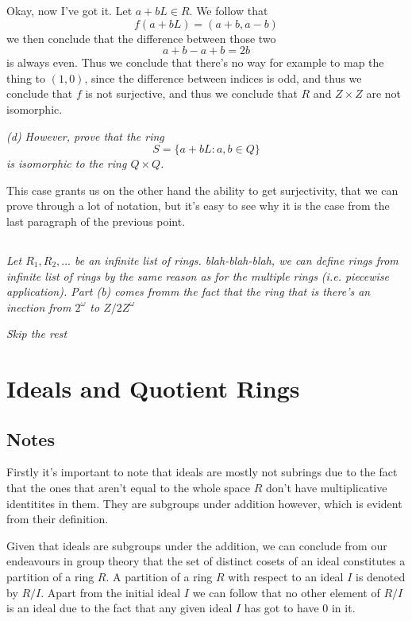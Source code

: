 \documentclass[11pt,oneside,titlepage]{book}
\newcommand{\set}[1]{\{ #1 \}}
\begin{document}
Okay, now I've got it. Let $a + bL \in R$. We follow that
$$f(a + bL) = (a + b, a - b)$$
we then conclude that the difference between those two
$$a + b - a + b = 2b$$
is always even. Thus we conclude that there's no way for example to
map the thing to $(1, 0)$, since the difference between indices is odd,
and thus we conclude that $f$ is not surjective, and thus we conclude that
$R$ and $Z \times Z$ are not isomorphic. 

\textit{(d) However, prove that the ring
  $$S = \set{a + bL: a, b \in Q}$$
  is isomorphic to the ring $Q \times Q$.
}

This case grants us on the other hand the ability to get surjectivity,
that we can prove through a lot of notation, but it's easy to see why
it is the case from the last paragraph of the previous point.

\subsection{}

\textit{Let $R_1, R_2, ...$ be an infinite list of
rings. blah-blah-blah, we can define rings from infinite list of rings
by the same reason as for the multiple rings (i.e. piecewise
application). Part (b) comes fromm the fact that the ring that is
there's an inection from $2^\omega$ to $Z/2Z^\omega$}

\textit{Skip the rest}

\section{Ideals and Quotient Rings}

\subsection*{Notes}

Firstly it's important to note that ideals are mostly not subrings due
to the fact that the ones that aren't equal to the whole space $R$
don't have multiplicative identitites in them. They are subgroups
under addition however, which is evident from their definition.

Given that ideals are subgroups under the addition, we can conclude
from our endeavours in group theory that the set of distinct cosets
of an ideal constitutes a partition of a ring $R$. A partition of a
ring $R$ with respect to an ideal $I$ is denoted by $R/I$. Apart from
the initial ideal $I$ we can follow that no other element of $R/I$ is
an ideal due to the fact that any given ideal $I$ has got to have $0$
in it.
\end{document}
